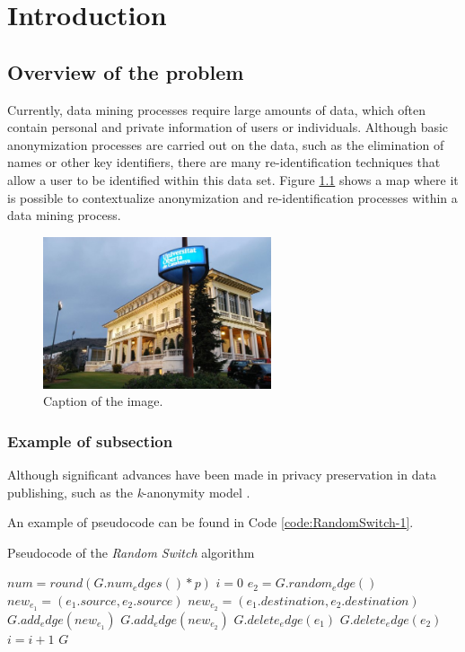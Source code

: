 
\chapter{Introduction}
\label{chapter:introduction}

\section{Overview of the problem}

Currently, data mining processes require large amounts of data, which often contain personal and private information of users or individuals. Although basic anonymization processes are carried out on the data, such as the elimination of names or other key identifiers, there are many re-identification techniques that allow a user to be identified within this data set. Figure \ref{fig:context-anoni1} shows a map where it is possible to contextualize anonymization and re-identification processes within a data mining process.

\begin{figure}
\centering
\includegraphics[width=0.6\textwidth]{figs/image1.png}
\caption{Caption of the image.}
\label{fig:context-anoni1}
\end{figure}

\subsection{Example of subsection}

Although significant advances have been made in privacy preservation in data publishing, such as the \textit{k}-anonymity model \cite{Sweeney:2002}.

An example of pseudocode can be found in Code \ref{code:RandomSwitch-1}.

\begin{algorithm}
\caption{Pseudocode of the \textit{Random Switch} algorithm}
\label{code:RandomSwitch-1}
\begin{algorithmic}
\STATE $num = round(G.num_edges() * p)$
\STATE $i = 0$
\STATE $e_{2} = G.random_edge()$
\STATE $new_{e_{1}} = (e_{1}.source, e_{2}.source)$
\STATE $new_{e_{2}} = (e_{1}.destination, e_{2}.destination)$
\STATE $G.add_edge(new_{e_{1}})$
\STATE $G.add_edge(new_{e_{2}})$
\STATE $G.delete_edge(e_{1})$
\STATE $G.delete_edge(e_{2})$
\STATE $i=i+1$
\ENDIF
\ENDWHILE
\RETURN $G$
\end{algorithmic}
\end{algorithm}

